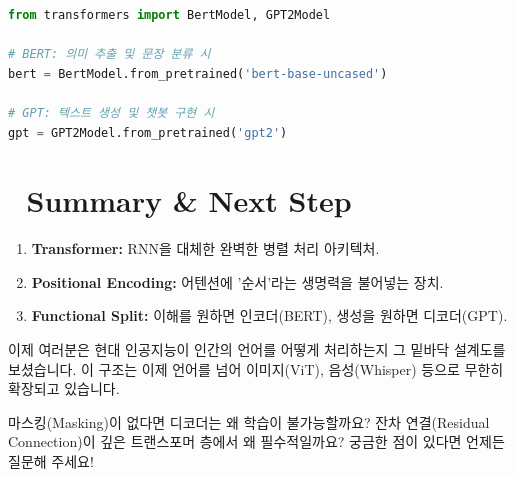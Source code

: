 \documentclass[11pt,a4paper]{book}
\theoremstyle{definition}
\begin{document}
\begin{lstlisting}[language=Python, caption=Loading Pre-trained Transformers, breaklines=true]
from transformers import BertModel, GPT2Model

# BERT: 의미 추출 및 문장 분류 시
bert = BertModel.from_pretrained('bert-base-uncased')

# GPT: 텍스트 생성 및 챗봇 구현 시
gpt = GPT2Model.from_pretrained('gpt2')
\end{lstlisting}

\section*{🏁 Summary \& Next Step}
\begin{enumerate}
    \item \textbf{Transformer:} RNN을 대체한 완벽한 병렬 처리 아키텍처.
    \item \textbf{Positional Encoding:} 어텐션에 '순서'라는 생명력을 불어넣는 장치.
    \item \textbf{Functional Split:} 이해를 원하면 인코더(BERT), 생성을 원하면 디코더(GPT).
\end{enumerate}

이제 여러분은 현대 인공지능이 인간의 언어를 어떻게 처리하는지 그 밑바닥 설계도를 보셨습니다. 이 구조는 이제 언어를 넘어 이미지(ViT), 음성(Whisper) 등으로 무한히 확장되고 있습니다.

\vspace{0.5cm}
\begin{summarybox}[title={생각해볼 거리}]
마스킹(Masking)이 없다면 디코더는 왜 학습이 불가능할까요? 잔차 연결(Residual Connection)이 깊은 트랜스포머 층에서 왜 필수적일까요? 궁금한 점이 있다면 언제든 질문해 주세요!
\end{summarybox}
\end{document}

